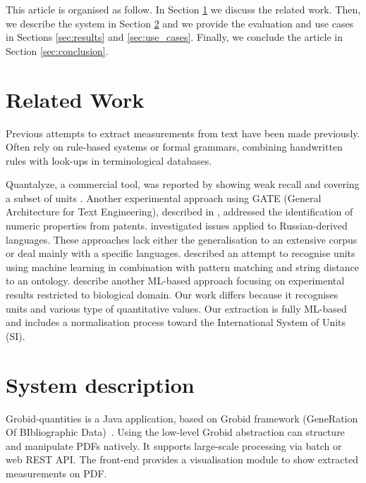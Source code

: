 \documentclass[sigconf]{acmart}
\begin{document}
This article is organised as follow. In Section \ref{sec:related_work} we discuss the related work. Then, we describe the system in Section \ref{sec:system} and we provide the evaluation and use cases in Sections \ref{sec:results} and  \ref{sec:use_cases}. Finally, we conclude the article in Section \ref{sec:conclusion}.

\section{Related Work}
\label{sec:related_work}
Previous attempts to extract measurements from text have been made previously. Often rely on rule-based systems or formal grammars, combining handwritten rules with look-ups in terminological databases.  

Quantalyze, a commercial tool, was reported by  \cite{hundman2017measurement} showing weak recall and covering a subset of units \cite{aras2014applications}. Another experimental approach using GATE (General Architecture for Text Engineering), described in \cite{agatonovic2008large}, addressed the identification of numeric properties from patents. \cite{am2013processing} investigated issues applied to Russian-derived languages. These approaches lack either the generalisation to an extensive corpus or deal mainly with a specific languages. \cite{berrahou2013extract} described an attempt to recognise units using machine learning in combination with pattern matching and string distance to an ontology. \cite{kang_extracting_2013} describe another ML-based approach focusing on experimental results restricted to biological domain. Our work differs because it recognises units and various type of quantitative values. Our extraction is fully ML-based and includes a normalisation process toward the International System of Units (SI). 

\section{System description}
\label{sec:system}
Grobid-quantities is a Java application, based on Grobid framework (GeneRation Of BIbliographic Data)~\cite{GROBID}. Using the low-level Grobid abstraction can structure and manipulate PDFs natively. It supports large-scale processing via batch or web REST API. The front-end provides a visualisation module to show extracted measurements on PDF.
\end{document}
